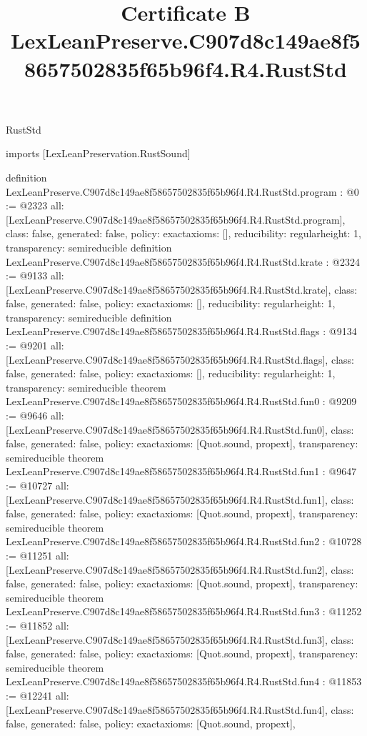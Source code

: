 \begin{lexlean}{RustStd}
\title{Certificate B LexLeanPreserve.C907d8c149ae8f58657502835f65b96f4.R4.RustStd}
\begin{coremodule}
imports [LexLeanPreservation.RustSound]

definition LexLeanPreserve.C907d8c149ae8f58657502835f65b96f4.R4.RustStd.program : @0 := @2323 {
  all: [LexLeanPreserve.C907d8c149ae8f58657502835f65b96f4.R4.RustStd.program],
  class: false,
  generated: false,
  policy: exact{axioms: []},
  reducibility: regular{height: 1},
  transparency: semireducible
}
definition LexLeanPreserve.C907d8c149ae8f58657502835f65b96f4.R4.RustStd.krate : @2324 := @9133 {
  all: [LexLeanPreserve.C907d8c149ae8f58657502835f65b96f4.R4.RustStd.krate],
  class: false,
  generated: false,
  policy: exact{axioms: []},
  reducibility: regular{height: 1},
  transparency: semireducible
}
definition LexLeanPreserve.C907d8c149ae8f58657502835f65b96f4.R4.RustStd.flags : @9134 := @9201 {
  all: [LexLeanPreserve.C907d8c149ae8f58657502835f65b96f4.R4.RustStd.flags],
  class: false,
  generated: false,
  policy: exact{axioms: []},
  reducibility: regular{height: 1},
  transparency: semireducible
}
theorem LexLeanPreserve.C907d8c149ae8f58657502835f65b96f4.R4.RustStd.fun0 : @9209 := @9646 {
  all: [LexLeanPreserve.C907d8c149ae8f58657502835f65b96f4.R4.RustStd.fun0],
  class: false,
  generated: false,
  policy: exact{axioms: [Quot.sound, propext]},
  transparency: semireducible
}
theorem LexLeanPreserve.C907d8c149ae8f58657502835f65b96f4.R4.RustStd.fun1 : @9647 := @10727 {
  all: [LexLeanPreserve.C907d8c149ae8f58657502835f65b96f4.R4.RustStd.fun1],
  class: false,
  generated: false,
  policy: exact{axioms: [Quot.sound, propext]},
  transparency: semireducible
}
theorem LexLeanPreserve.C907d8c149ae8f58657502835f65b96f4.R4.RustStd.fun2 : @10728 := @11251 {
  all: [LexLeanPreserve.C907d8c149ae8f58657502835f65b96f4.R4.RustStd.fun2],
  class: false,
  generated: false,
  policy: exact{axioms: [Quot.sound, propext]},
  transparency: semireducible
}
theorem LexLeanPreserve.C907d8c149ae8f58657502835f65b96f4.R4.RustStd.fun3 : @11252 := @11852 {
  all: [LexLeanPreserve.C907d8c149ae8f58657502835f65b96f4.R4.RustStd.fun3],
  class: false,
  generated: false,
  policy: exact{axioms: [Quot.sound, propext]},
  transparency: semireducible
}
theorem LexLeanPreserve.C907d8c149ae8f58657502835f65b96f4.R4.RustStd.fun4 : @11853 := @12241 {
  all: [LexLeanPreserve.C907d8c149ae8f58657502835f65b96f4.R4.RustStd.fun4],
  class: false,
  generated: false,
  policy: exact{axioms: [Quot.sound, propext]},
}
\end{coremodule}
\end{lexlean}

